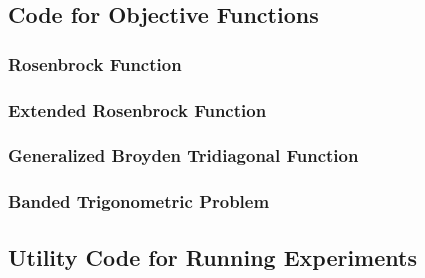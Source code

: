\documentclass[a4paper,12pt]{article}
\begin{document}
	\subsection{Code for Objective Functions}
	\subsubsection{Rosenbrock Function}
	\subsubsection{Extended Rosenbrock Function}
	\subsubsection{Generalized Broyden Tridiagonal Function}
	\subsubsection{Banded Trigonometric Problem}
	\subsection{Utility Code for Running Experiments}
	
\end{document}
